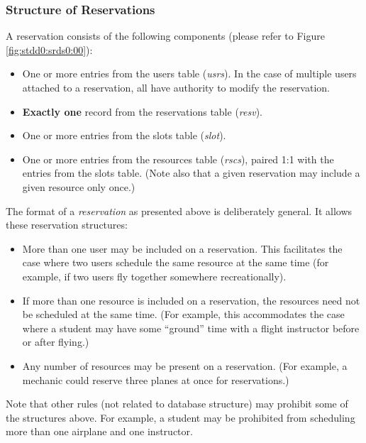 \documentclass[letterpaper,10pt,titlepage]{article}
\begin{document}

\subsubsection{Structure of Reservations}
\label{stdd0:sres0}

A reservation consists of the following components (please
refer to Figure \ref{fig:stdd0:srds0:00}):

\begin{itemize}
\item One or more entries from the users table (\emph{usrs}).  In the case
      of multiple users attached to a reservation, all have authority to
      modify the reservation.
\item \textbf{Exactly one} record from the reservations table (\emph{resv}).
\item One or more entries from the slots table (\emph{slot}).
\item One or more entries from the resources table (\emph{rscs}), paired 
      1:1 with the entries from the slots table.  (Note also that a given reservation
      may include a given resource only once.)
\end{itemize}

The format of a \emph{reservation} as presented above is deliberately general.
It allows these reservation structures:

\begin{itemize}
\item More than one user may be included on a reservation.  This facilitates
      the case where two users schedule the same resource at the same time (for example,
      if two users fly together somewhere recreationally).
\item If more than one resource is included on a reservation, the resources need not be
      scheduled at the same time.  (For example, this accommodates the case where a student may have
      some ``ground'' time with a flight instructor before or after flying.)
\item Any number of resources may be present on a reservation.
      (For example, a mechanic could reserve three planes at once for reservations.)
\end{itemize}

Note that other rules (not related to database structure) may prohibit 
some of the structures above.  For example, a student may be prohibited
from scheduling more than one airplane and one instructor.
\end{document}
